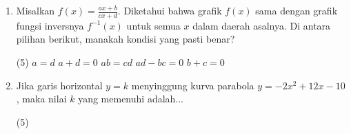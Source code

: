 \documentclass[12pt]{scrartcl}
\begin{document}
\begin{enumerate}
\begin{tasks}[label=\Alph*](5)     
\end{tasks}

\item Misalkan $f(x) = \frac{ax + b}{cx + d}$. Diketahui bahwa grafik $f(x)$ sama dengan grafik fungsi inversnya $f^{-1}(x)$ untuk semua $x$ dalam daerah asalnya. Di antara pilihan berikut, manakah kondisi yang pasti benar?

\begin{tasks}[label=\Alph*](5) \task $a = d$ \task $a + d = 0$ \task $ab = cd$ \task $ad - bc = 0$ \task $b + c = 0$
\end{tasks}



\item Jika garis horizontal $y = k$ menyinggung kurva parabola $y = -2x^2 + 12x - 10$, maka nilai $k$ yang memenuhi adalah...

\begin{tasks}[label=\Alph*](5)     
\end{tasks}


\end{enumerate}
\end{document}
